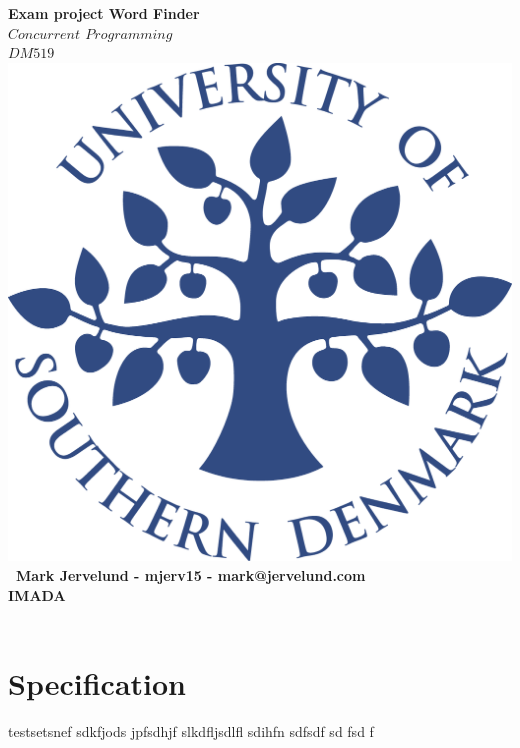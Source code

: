 \documentclass[a4paper,10pt,titlepage]{report}
\date{}
\begin{document}
\begin{titlepage}
\centering
    \vspace*{2\baselineskip}
    \huge
    \bfseries
    Exam project Word Finder \\

    \normalfont
	\huge
     \(Concurrent\)  \(Programming\) \\ \( DM519\)  \\ [3\baselineskip]
    \normalfont
	\includegraphics[scale=0.2]{SDU_logo}\\
	 
	
        \vfill\
    Mark Jervelund - mjerv15 - mark@jervelund.com \\
    \vspace{10mm}
    IMADA \\
    \vspace{5mm}
    \textbf{\datedate}  \bf{} \\[2\baselineskip]
\end{titlepage}
\newpage
\renewcommand{\thepage}{\roman{page}}%
\tableofcontents

\newpage
\setcounter{page}{1}
\renewcommand{\thepage}{\arabic{page}}

\section{Specification}
testsetsnef sdkfjods jpfsdhjf slkdfljsdlfl sdihfn sdfsdf sd fsd f
\end{document}
